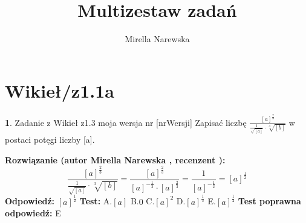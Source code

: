 \documentclass[12pt, a4paper]{article}
\title{Multizestaw zadań}
\author{Mirella Narewska}
\date{}
\theoremstyle{definition} %
\newtheorem{zad}{}
\newcommand{\kategoria}[1]{\section{#1}} %
\newcommand{\zadStart}[1]{\begin{zad}#1\newline} %
\newcommand{\zadStop}{\end{zad}}   %
\newcommand{\rozwStart}[2]{\noindent \textbf{Rozwiązanie (autor #1 , recenzent #2): }\newline} %
\newcommand{\rozwStop}{\newline}                                            %
\newcommand{\odpStart}{\noindent \textbf{Odpowiedź:}\newline}    %
\newcommand{\odpStop}{\newline}                                             %
\newcommand{\testStart}{\noindent \textbf{Test:}\newline} %
\newcommand{\testStop}{\newline} %
\newcommand{\kluczStart}{\noindent \textbf{Test poprawna odpowiedź:}\newline} %
\newcommand{\kluczStop}{\newline} %
\begin{document}
\maketitle


\kategoria{Wikieł/z1.1a}
\zadStart{Zadanie z Wikieł z1.3  moja wersja nr [nrWersji]}
Zapisać liczbę $\frac{[a]^{\frac{2}{3}}}{\frac{1}{\sqrt{[a]}}\cdot \sqrt[3]{[b]}}$ w postaci potęgi liczby [a].
\zadStop
\rozwStart{Mirella Narewska}{}
$$\frac{[a]^{\frac{2}{3}}}{\frac{1}{\sqrt{[a]}}\cdot \sqrt[3]{[b]}}= \frac{[a]^{\frac{2}{3}}}{[a]^{-\frac{1}{2}} \cdot [a]^{\frac{2}{3}}}=\frac{1}{[a]^{-\frac{1}{2}}}=[a]^{\frac{1}{2}}$$
\rozwStop
\odpStart
$[a]^{\frac{1}{2}}$
\odpStop
\testStart
A.$[a]$
B.$0$
C.$[a]^{2}$
D.$[a]^{\frac{1}{3}}$
E.$[a]^{\frac{1}{2}}$
\testStop
\kluczStart
E
\kluczStop
\end{document}
